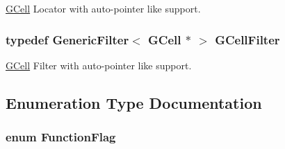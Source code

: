 \hyperlink{classKatabatic_1_1GCell}{G\-Cell} Locator with auto-\/pointer like support. \hypertarget{namespaceKatabatic_a7d07e23d45818a2ae5f6881ce0ec7403}{
\subsubsection[{G\-Cell\-Filter}]{\setlength{\rightskip}{0pt plus 5cm}typedef {\bf Generic\-Filter}$<$ {\bf G\-Cell} $\ast$ $>$ {\bf G\-Cell\-Filter}}}\label{namespaceKatabatic_a7d07e23d45818a2ae5f6881ce0ec7403}
\hyperlink{classKatabatic_1_1GCell}{G\-Cell} Filter with auto-\/pointer like support. 

\subsection{Enumeration Type Documentation}
\hypertarget{namespaceKatabatic_a2af2ad6b6441614038caf59d04b3b217}{
\subsubsection[{Function\-Flag}]{\setlength{\rightskip}{0pt plus 5cm}enum {\bf Function\-Flag}}}\label{namespaceKatabatic_a2af2ad6b6441614038caf59d04b3b217}
